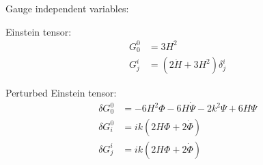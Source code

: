 Gauge independent variables:

Einstein tensor:
\begin{align}
  G^{0}_{0} &= 3 H^2 \\
  G^{i}_{j} &= \left( 2\dot{H} + 3H^2 \right)\delta^{i}_{j}
\end{align}

Perturbed Einstein tensor:
\begin{align}
  \delta G^{0}_{0} &=-6H^2\Phi-6H\dot{\Psi} -2k^2 \Psi + 6H \Psi  \\
  \delta G^{0}_{i} &=ik\left( 2H\Phi + 2\dot{\Phi} \right)\\
  \delta G^{i}_{j} &=ik\left( 2H\Phi + 2\dot{\Phi} \right)
\end{align}
